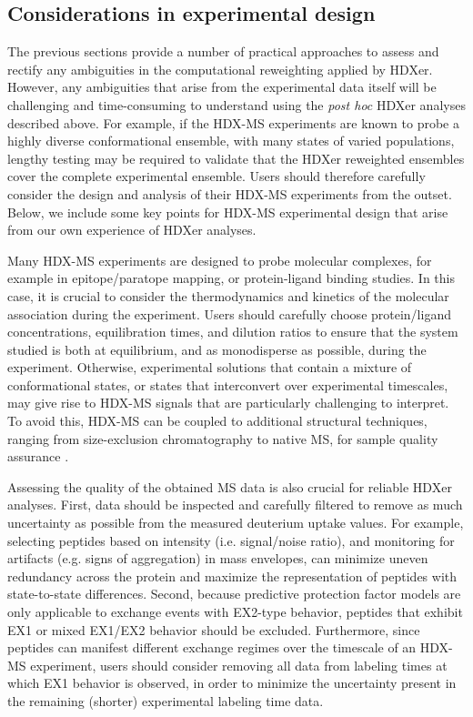 \documentclass[9pt,tutorial]{livecoms}
\begin{document}
\subsection{Considerations in experimental design}
The previous sections provide a number of practical approaches to assess and rectify any ambiguities in the computational reweighting applied by HDXer.
However, any ambiguities that arise from the experimental data itself will be challenging and time-consuming to understand using the \textit{post hoc} HDXer analyses described above.
For example, if the HDX-MS experiments are known to probe a highly diverse conformational ensemble, with many states of varied populations, lengthy testing may be required to validate that the HDXer reweighted ensembles cover the complete experimental ensemble.
Users should therefore carefully consider the design and analysis of their HDX-MS experiments from the outset.
Below, we include some key points for HDX-MS experimental design that arise from our own experience of HDXer analyses.

Many HDX-MS experiments are designed to probe molecular complexes, for example in epitope/paratope mapping, or protein-ligand binding studies.
In this case, it is crucial to consider the thermodynamics and kinetics of the molecular association during the experiment.
Users should carefully choose protein/ligand concentrations, equilibration times, and dilution ratios to ensure that the system studied is both at equilibrium, and as monodisperse as possible, during the experiment.
Otherwise, experimental solutions that contain a mixture of conformational states, or states that interconvert over experimental timescales, may give rise to HDX-MS signals that are particularly challenging to interpret.
To avoid this, HDX-MS can be coupled to additional structural techniques, ranging from size-exclusion chromatography to native MS, for sample quality assurance \cite{Masson2019,OBrien2018}.

Assessing the quality of the obtained MS data is also crucial for reliable HDXer analyses.
First, data should be inspected and carefully filtered to remove as much uncertainty as possible from the measured deuterium uptake values.
For example, selecting peptides based on intensity (i.e. signal/noise ratio), and monitoring for artifacts (e.g. signs of aggregation) in mass envelopes, can minimize uneven redundancy across the protein and maximize the representation of peptides with state-to-state differences.
Second, because predictive protection factor models are only applicable to exchange events with EX2-type behavior, peptides that exhibit EX1 or mixed EX1/EX2 behavior should be excluded.
Furthermore, since peptides can manifest different exchange regimes over the timescale of an HDX-MS experiment, users should consider removing all data from labeling times at which EX1 behavior is observed, in order to minimize the uncertainty present in the remaining (shorter) experimental labeling time data.
\end{document}
